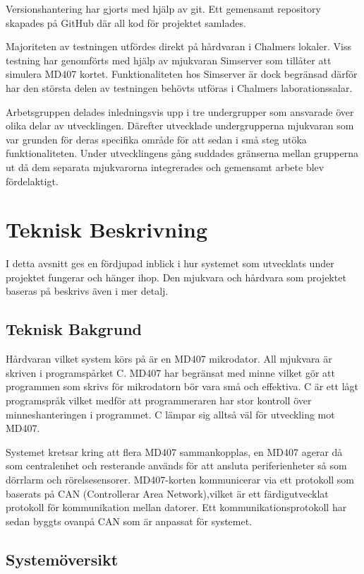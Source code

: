 \documentclass[a4paper]{article}
\begin{document}
Versionshantering har gjorts med hjälp av git. Ett gemensamt repository skapades på GitHub där all kod för projektet samlades.

Majoriteten av testningen utfördes direkt på hårdvaran i Chalmers lokaler. Viss testning har genomförts med hjälp av mjukvaran Simserver som tillåter att simulera MD407 kortet. Funktionaliteten hos Simserver är dock begränsad därför har den största delen av testningen behövts utföras i Chalmers laborationssalar.

Arbetsgruppen delades inledningsvis upp i tre undergrupper som ansvarade över olika delar av utvecklingen. Därefter utvecklade undergrupperna mjukvaran som var grunden för deras specifika område för att sedan i små steg utöka funktionaliteten. Under utvecklingens gång suddades gränserna mellan grupperna ut då dem separata mjukvarorna integrerades och gemensamt arbete blev fördelaktigt.


\section{Teknisk Beskrivning}
I detta avsnitt ges en fördjupad inblick i hur systemet som utvecklats under projektet fungerar och hänger ihop. Den mjukvara och hårdvara som projektet baseras på beskrivs även i mer detalj.

\subsection{Teknisk Bakgrund}
Hårdvaran vilket system körs på är en MD407 mikrodator. All mjukvara är skriven i programspårket C. MD407 har begränsat med minne vilket gör att programmen som skrivs för mikrodatorn bör vara små och effektiva. C är ett lågt programspråk vilket medför att programmeraren har stor kontroll över minneshanteringen i programmet. C lämpar sig alltså väl för utveckling mot MD407.

Systemet kretsar kring att flera MD407 sammankopplas, en MD407 agerar då som centralenhet och resterande används för att ansluta periferienheter så som dörrlarm och rörelsesensorer. MD407-korten kommunicerar via ett protokoll som baserats på CAN (Controllerar Area Network),vilket är ett färdigutvecklat protokoll för kommunikation mellan datorer. Ett kommunikationsprotokoll har sedan byggts ovanpå CAN som är anpassat för systemet.

\subsection{Systemöversikt}
\end{document}
